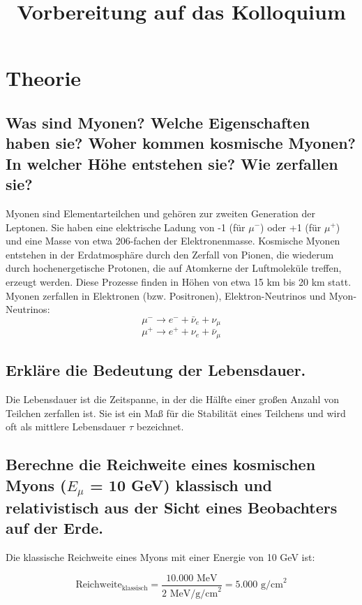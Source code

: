 \documentclass[a4paper,12pt]{article}
\begin{document}
\title{Vorbereitung auf das Kolloquium}
\author{}
\date{}

\maketitle

\section{Theorie}

{\small
\subsection{Was sind Myonen? Welche Eigenschaften haben sie? Woher kommen kosmische Myonen? In welcher Höhe entstehen sie? Wie zerfallen sie?}
Myonen sind Elementarteilchen und gehören zur zweiten Generation der Leptonen. Sie haben eine elektrische Ladung von -1 (für $\mu^-$) oder +1 (für $\mu^+$) und eine Masse von etwa 206-fachen der Elektronenmasse. Kosmische Myonen entstehen in der Erdatmosphäre durch den Zerfall von Pionen, die wiederum durch hochenergetische Protonen, die auf Atomkerne der Luftmoleküle treffen, erzeugt werden. Diese Prozesse finden in Höhen von etwa 15 km bis 20 km statt. Myonen zerfallen in Elektronen (bzw. Positronen), Elektron-Neutrinos und Myon-Neutrinos:
$$\mu^- \rightarrow e^- + \bar{\nu}_e + \nu_\mu$$
$$\mu^+ \rightarrow e^+ + \nu_e + \bar{\nu}_\mu$$

\subsection{Erkläre die Bedeutung der Lebensdauer.}
Die Lebensdauer ist die Zeitspanne, in der die Hälfte einer großen Anzahl von Teilchen zerfallen ist. Sie ist ein Maß für die Stabilität eines Teilchens und wird oft als mittlere Lebensdauer $\tau$ bezeichnet.

\subsection{Berechne die Reichweite eines kosmischen Myons ($E_{\mu}$ = 10 GeV) klassisch und relativistisch aus der Sicht eines Beobachters auf der Erde.}

Die klassische Reichweite eines Myons mit einer Energie von 10 GeV ist:



\[
\text{Reichweite}_{\text{klassisch}} = \frac{10.000 \text{ MeV}}{2 \text{ MeV/g/cm}^2} = 5.000 \text{ g/cm}^2
\]

}
\end{document}
